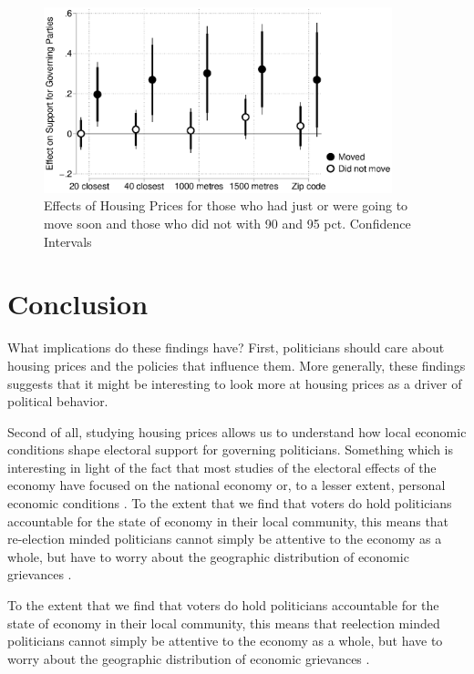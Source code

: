 \documentclass[12pt,a4paper]{article}
\begin{document}
\begin{figure}[htbp!]
	\includegraphics[width=0.9\textwidth]{../figures/moving.eps}
	\centering
	\caption{Effects of Housing Prices for those who had just or were going to move soon and those who did not with 90 and 95 pct. Confidence Intervals}\label{move}
\end{figure}





\section{Conclusion}

What implications do these findings have? First,  politicians should care about housing prices and the policies that influence them.  More generally, these findings suggests that it might be interesting to look more at housing prices as a driver of political behavior.
 
 Second of all, studying housing prices allows us to understand how local economic conditions shape electoral support for governing politicians. Something which is interesting in light of the fact that most studies of the electoral effects of the economy have focused on the national economy or, to a lesser extent, personal economic conditions \citep[290]{healy2013retrospective}. To the extent that we find that voters do hold politicians accountable for the state of economy in their local community, this means that re-election minded politicians cannot simply be attentive to the economy as a whole, but have to worry about the geographic distribution of economic grievances \citep[cf.][11]{ferejohn1986incumbent}. 

 To the extent that we find that voters do hold politicians accountable for the state of economy in their local community, this means that reelection minded politicians cannot simply be attentive to the economy as a whole, but have to worry about the geographic distribution of economic grievances \citep[cf.][11]{ferejohn1986incumbent}. 
\end{document}
